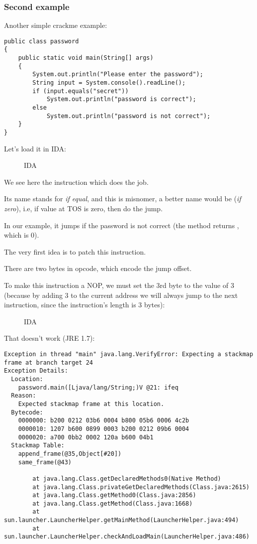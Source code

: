 \subsubsection{Second example}

Another simple crackme example:

\begin{lstlisting}[style=customjava]
public class password
{
	public static void main(String[] args)
	{
		System.out.println("Please enter the password");
		String input = System.console().readLine();
		if (input.equals("secret"))
			System.out.println("password is correct");
		else
			System.out.println("password is not correct");
	}
}
\end{lstlisting}

Let's load it in IDA:

\begin{figure}[H]
\centering
{}
\caption{IDA}
\end{figure}

We see here the  instruction which does the job.

Its name stands for \emph{if equal}, and this is misnomer, a better name would be  (\emph{if zero}), i.e, 
if value at \ac{TOS} is zero, then do the jump.

In our example, it jumps if the password is not correct 
(the  method returns , which is 0).

The very first idea is to patch this instruction.

There are two bytes in  opcode, which encode the jump offset.

To make this instruction a NOP, we must set the 3rd byte to the value of 3 
(because by adding 3 to the current address we will always jump to the next instruction,
since the  instruction's length is 3 bytes):


\begin{figure}[H]
\centering
{}
\caption{IDA}
\end{figure}

That doesn't work (JRE 1.7):

\begin{lstlisting}
Exception in thread "main" java.lang.VerifyError: Expecting a stackmap frame at branch target 24
Exception Details:
  Location:
    password.main([Ljava/lang/String;)V @21: ifeq
  Reason:
    Expected stackmap frame at this location.
  Bytecode:
    0000000: b200 0212 03b6 0004 b800 05b6 0006 4c2b
    0000010: 1207 b600 0899 0003 b200 0212 09b6 0004
    0000020: a700 0bb2 0002 120a b600 04b1
  Stackmap Table:
    append_frame(@35,Object[#20])
    same_frame(@43)

        at java.lang.Class.getDeclaredMethods0(Native Method)
        at java.lang.Class.privateGetDeclaredMethods(Class.java:2615)
        at java.lang.Class.getMethod0(Class.java:2856)
        at java.lang.Class.getMethod(Class.java:1668)
        at sun.launcher.LauncherHelper.getMainMethod(LauncherHelper.java:494)
        at sun.launcher.LauncherHelper.checkAndLoadMain(LauncherHelper.java:486)
\end{lstlisting}

